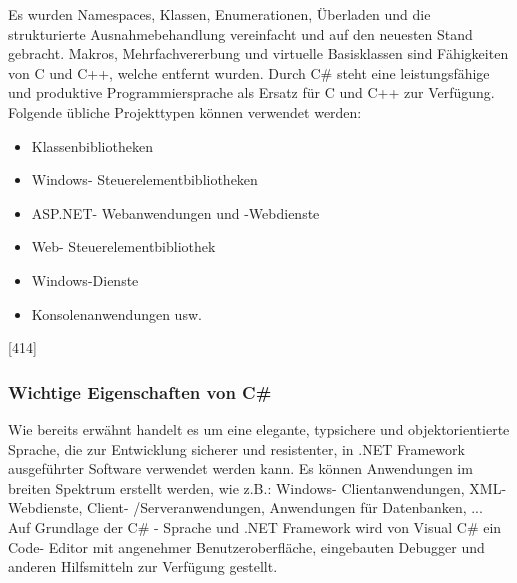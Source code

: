\documentclass[12pt,a4paper]{report}
\begin{document}
\begin{onehalfspace}
Es wurden Namespaces, Klassen, Enumerationen, Überladen und die strukturierte Ausnahmebehandlung vereinfacht und auf den neuesten Stand gebracht. Makros, Mehrfachvererbung und virtuelle Basisklassen sind Fähigkeiten von C und C++, welche entfernt wurden. Durch C\# steht eine leistungsfähige und produktive Programmiersprache als Ersatz für C und C++ zur Verfügung.
\\Folgende übliche Projekttypen können verwendet werden:
\begin{itemize}
\item Klassenbibliotheken
\item Windows- Steuerelementbibliotheken
\item ASP.NET- Webanwendungen und -Webdienste
\item Web- Steuerelementbibliothek
\item Windows-Dienste
\item Konsolenanwendungen usw.
\end{itemize}
[414]
\subsubsection{Wichtige Eigenschaften von C\#}
Wie bereits erwähnt handelt es um eine elegante, typsichere und objektorientierte Sprache, die zur Entwicklung sicherer und resistenter, in .NET Framework ausgeführter Software verwendet werden kann. Es können Anwendungen im breiten Spektrum erstellt werden, wie z.B.: Windows- Clientanwendungen, XML- Webdienste, Client- /Serveranwendungen, Anwendungen für Datenbanken, ...\\

Auf Grundlage der C\# - Sprache und .NET Framework wird von Visual C\# ein Code- Editor mit angenehmer Benutzeroberfläche, eingebauten Debugger und anderen Hilfsmitteln zur Verfügung gestellt.\\


\end{onehalfspace}
\end{document}
